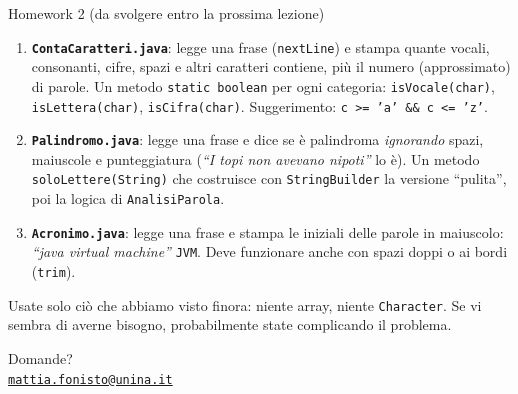 \documentclass[10pt,aspectratio=169]{beamer}
\begin{document}
\begin{frame}{Homework 2 (da svolgere entro la prossima lezione)}
\begin{enumerate}\itemsep=4pt
    \item \textbf{\texttt{ContaCaratteri.java}}: legge una frase (\texttt{nextLine}) e stampa quante vocali, consonanti, cifre, spazi e altri caratteri contiene, più il numero (approssimato) di parole. Un metodo \texttt{static boolean} per ogni categoria: \texttt{isVocale(char)}, \texttt{isLettera(char)}, \texttt{isCifra(char)}. \small Suggerimento: \texttt{c >= 'a' \&\& c <= 'z'}.\normalsize
    \item \textbf{\texttt{Palindromo.java}}: legge una frase e dice se è palindroma \emph{ignorando} spazi, maiuscole e punteggiatura (\emph{``I topi non avevano nipoti''} lo è). Un metodo \texttt{soloLettere(String)} che costruisce con \texttt{StringBuilder} la versione ``pulita'', poi la logica di \texttt{AnalisiParola}.
    \item \textbf{\texttt{Acronimo.java}}: legge una frase e stampa le iniziali delle parole in maiuscolo: \emph{``java virtual machine''} \textrightarrow{} \texttt{JVM}. Deve funzionare anche con spazi doppi o ai bordi (\texttt{trim}).
\end{enumerate}

\vspace{0.2cm}
\small Usate solo ciò che abbiamo visto finora: niente array, niente \texttt{Character}. Se vi sembra di averne bisogno, probabilmente state complicando il problema.
\end{frame}

\begin{frame}
\begin{center}
{\Huge Domande?}\\[2.5em]
{\normalsize \href{mailto:mattia.fonisto@unina.it}{\texttt{mattia.fonisto@unina.it}}}
\end{center}
\end{frame}
\end{document}
